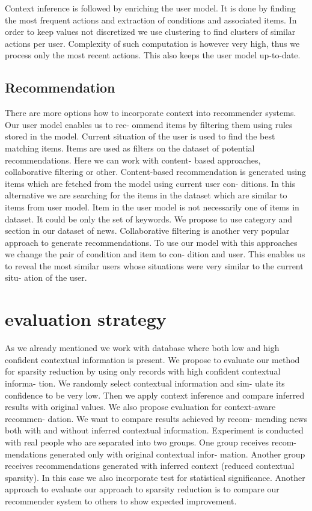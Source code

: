 \documentclass{acm_proc_article-sp} %
\begin{document}
Context inference is followed by enriching the user model.
It is done by finding the most frequent actions and extraction
of conditions and associated items. In order to keep values
not discretized we use clustering to find clusters of similar
actions per user. Complexity of such computation is however
very high, thus we process only the most recent actions. This
also keeps the user model up-to-date.

\subsection{Recommendation}

There are more options how to incorporate context into
recommender systems. Our user model enables us to rec-
ommend items by filtering them using rules stored in the
model. Current situation of the user is used to find the best
matching items. Items are used as filters on the dataset of
potential recommendations. Here we can work with content-
based approaches, collaborative filtering or other.
Content-based recommendation is generated using items
which are fetched from the model using current user con-
ditions. In this alternative we are searching for the items
in the dataset which are similar to items from user model.
Item in the user model is not necessarily one of items in
dataset. It could be only the set of keywords. We propose
to use category and section in our dataset of news.
Collaborative filtering is another very popular approach
to generate recommendations. To use our model with this
approaches we change the pair of condition and item to con-
dition and user. This enables us to reveal the most similar
users whose situations were very similar to the current situ-
ation of the user.

\section{evaluation strategy}

As we already mentioned we work with database where
both low and high confident contextual information is present.
We propose to evaluate our method for sparsity reduction by
using only records with high confident contextual informa-
tion. We randomly select contextual information and sim-
ulate its confidence to be very low. Then we apply context
inference and compare inferred results with original values.
We also propose evaluation for context-aware recommen-
dation. We want to compare results achieved by recom-
mending news both with and without inferred contextual
information. Experiment is conducted with real people who
are separated into two groups. One group receives recom-
mendations generated only with original contextual infor-
mation. Another group receives recommendations generated
with inferred context (reduced contextual sparsity). In this
case we also incorporate test for statistical significance.
Another approach to evaluate our approach to sparsity
reduction is to compare our recommender system to others
to show expected improvement.
\end{document}
